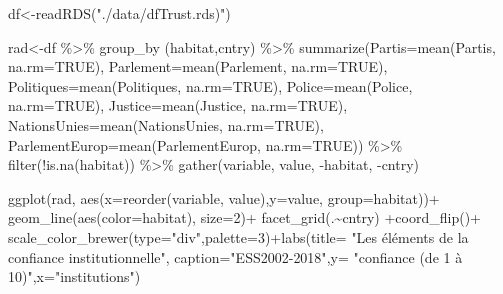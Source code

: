 \documentclass[
]{book}
\newenvironment{Shaded}{\begin{snugshade}}{\end{snugshade}}
\newcommand{\AttributeTok}[1]{\textcolor[rgb]{0.77,0.63,0.00}{#1}}
\newcommand{\ConstantTok}[1]{\textcolor[rgb]{0.00,0.00,0.00}{#1}}
\newcommand{\DecValTok}[1]{\textcolor[rgb]{0.00,0.00,0.81}{#1}}
\newcommand{\FunctionTok}[1]{\textcolor[rgb]{0.00,0.00,0.00}{#1}}
\newcommand{\NormalTok}[1]{#1}
\newcommand{\OtherTok}[1]{\textcolor[rgb]{0.56,0.35,0.01}{#1}}
\newcommand{\SpecialCharTok}[1]{\textcolor[rgb]{0.00,0.00,0.00}{#1}}
\newcommand{\StringTok}[1]{\textcolor[rgb]{0.31,0.60,0.02}{#1}}
\begin{document}
\begin{Shaded}
\begin{Highlighting}[]
\NormalTok{df}\OtherTok{\textless{}{-}}\FunctionTok{readRDS}\NormalTok{(}\StringTok{"./data/dfTrust.rds)"}\NormalTok{)}


\NormalTok{rad}\OtherTok{\textless{}{-}}\NormalTok{df }\SpecialCharTok{\%\textgreater{}\%} 
  \FunctionTok{group\_by}\NormalTok{ (habitat,cntry) }\SpecialCharTok{\%\textgreater{}\%} 
  \FunctionTok{summarize}\NormalTok{(}\AttributeTok{Partis=}\FunctionTok{mean}\NormalTok{(Partis, }\AttributeTok{na.rm=}\ConstantTok{TRUE}\NormalTok{),}
  \AttributeTok{Parlement=}\FunctionTok{mean}\NormalTok{(Parlement, }\AttributeTok{na.rm=}\ConstantTok{TRUE}\NormalTok{),}
  \AttributeTok{Politiques=}\FunctionTok{mean}\NormalTok{(Politiques, }\AttributeTok{na.rm=}\ConstantTok{TRUE}\NormalTok{),}
  \AttributeTok{Police=}\FunctionTok{mean}\NormalTok{(Police, }\AttributeTok{na.rm=}\ConstantTok{TRUE}\NormalTok{),}
  \AttributeTok{Justice=}\FunctionTok{mean}\NormalTok{(Justice, }\AttributeTok{na.rm=}\ConstantTok{TRUE}\NormalTok{),}
  \AttributeTok{NationsUnies=}\FunctionTok{mean}\NormalTok{(NationsUnies, }\AttributeTok{na.rm=}\ConstantTok{TRUE}\NormalTok{),}
  \AttributeTok{ParlementEurop=}\FunctionTok{mean}\NormalTok{(ParlementEurop, }\AttributeTok{na.rm=}\ConstantTok{TRUE}\NormalTok{)) }\SpecialCharTok{\%\textgreater{}\%} 
  \FunctionTok{filter}\NormalTok{(}\SpecialCharTok{!}\FunctionTok{is.na}\NormalTok{(habitat)) }\SpecialCharTok{\%\textgreater{}\%}
  \FunctionTok{gather}\NormalTok{(variable, value, }\SpecialCharTok{{-}}\NormalTok{habitat, }\SpecialCharTok{{-}}\NormalTok{cntry)}

\FunctionTok{ggplot}\NormalTok{(rad, }\FunctionTok{aes}\NormalTok{(}\AttributeTok{x=}\FunctionTok{reorder}\NormalTok{(variable, value),}\AttributeTok{y=}\NormalTok{value, }\AttributeTok{group=}\NormalTok{habitat))}\SpecialCharTok{+}
  \FunctionTok{geom\_line}\NormalTok{(}\FunctionTok{aes}\NormalTok{(}\AttributeTok{color=}\NormalTok{habitat), }\AttributeTok{size=}\DecValTok{2}\NormalTok{)}\SpecialCharTok{+}
  \FunctionTok{facet\_grid}\NormalTok{(.}\SpecialCharTok{\textasciitilde{}}\NormalTok{cntry) }\SpecialCharTok{+}\FunctionTok{coord\_flip}\NormalTok{()}\SpecialCharTok{+}
  \FunctionTok{scale\_color\_brewer}\NormalTok{(}\AttributeTok{type=}\StringTok{"div"}\NormalTok{,}\AttributeTok{palette=}\DecValTok{3}\NormalTok{)}\SpecialCharTok{+}\FunctionTok{labs}\NormalTok{(}\AttributeTok{title=} \StringTok{"Les éléments de la confiance institutionnelle"}\NormalTok{, }\AttributeTok{caption=}\StringTok{"ESS2002{-}2018"}\NormalTok{,}\AttributeTok{y=} \StringTok{"confiance (de 1 à 10)"}\NormalTok{,}\AttributeTok{x=}\StringTok{"institutions"}\NormalTok{) }
\end{Highlighting}
\end{Shaded}
\end{document}
